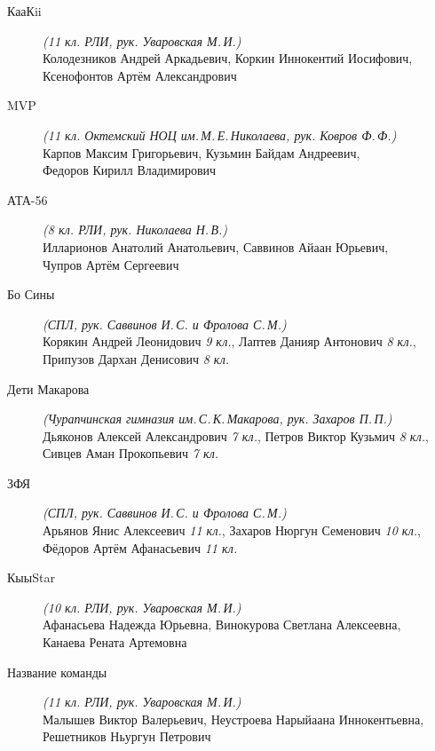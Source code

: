 \begin{description}
\item[КааКii] \textit{(11 кл. РЛИ, рук. Уваровская М.\,И.)} \\
Колодезников Андрей Аркадьевич, Коркин Иннокентий Иосифович, \\
Ксенофонтов Артём Александрович

\item[MVP] \textit{(11 кл. Октемский НОЦ им.\,М.\,Е.\,Николаева, рук. Ковров Ф.\,Ф.)} \\
Карпов Максим Григорьевич, Кузьмин Байдам Андреевич, \\
Федоров Кирилл Владимирович

\item[АТА-56] \textit{(8 кл. РЛИ, рук. Николаева Н.\,В.)} \\
Илларионов Анатолий Анатольевич, Саввинов Айаан Юрьевич, \\
Чупров Артём Сергеевич

\item[Бо Сины] \textit{(СПЛ, рук. Саввинов И.\,С. и Фролова С.\,М.)} \\
Корякин Андрей Леонидович \textit{9 кл.}, Лаптев Данияр Антонович \textit{8 кл.}, \\
Припузов Дархан Денисович \textit{8 кл.}

\item[Дети Макарова] \textit{(Чурапчинская гимназия им.\,С.\,К.\,Макарова, рук. Захаров П.\,П.)} \\
Дьяконов Алексей Александрович \textit{7 кл.}, Петров Виктор Кузьмич \textit{8 кл.}, \\
Сивцев Аман Прокопьевич \textit{7 кл.}

\item[ЗФЯ] \textit{(СПЛ, рук. Саввинов И.\,С. и Фролова С.\,М.)} \\
Арьянов Янис Алексеевич \textit{11 кл.}, Захаров Нюргун Семенович \textit{10 кл.}, \\
Фёдоров Артём Афанасьевич \textit{11 кл.}

\item[КыыStar] \textit{(10 кл. РЛИ, рук. Уваровская М.\,И.)} \\
Афанасьева Надежда Юрьевна, Винокурова Светлана Алексеевна, \\
Канаева Рената Артемовна

\item[Название команды] \textit{(11 кл. РЛИ, рук. Уваровская М.\,И.)} \\
Малышев Виктор Валерьевич, Неустроева Нарыйаана Иннокентьевна, \\
Решетников Ньургун Петрович


\end{description}

